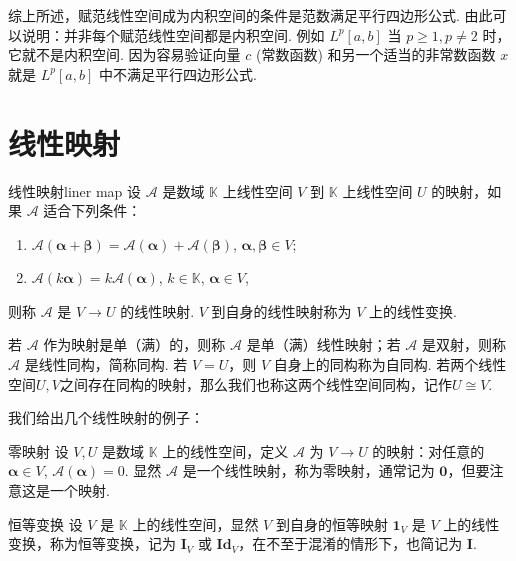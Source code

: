 \documentclass[12pt, a4paper,newtx]{ctexart}
\begin{document}
综上所述，赋范线性空间成为内积空间的条件是范数满足平行四边形公式. 由此可以说明：并非每个赋范线性空间都是内积空间. 例如 $L^p[a,b]$ 当 $p \geq 1, p \neq 2$ 时，它就不是内积空间. 因为容易验证向量 $c$ (常数函数) 和另一个适当的非常数函数 $x$ 就是 $L^p[a,b]$ 中不满足平行四边形公式.
\section{线性映射}
\begin{definition}{线性映射}{liner map}\kaishu 
	设 $\mathcal A$ 是数域 $\mathbb{K}$ 上线性空间 $V$ 到 $\mathbb{K}$ 上线性空间 $U$ 的映射，如果 $\mathcal A$ 适合下列条件：
	\begin{enumerate}
		\item $\mathcal A(\bm\alpha + \bm\beta) = \mathcal A(\bm\alpha) + \mathcal A(\bm\beta)$, $\bm\alpha, \bm\beta \in V$;
		\item $\mathcal A(k\bm\alpha) = k\mathcal A(\bm\alpha)$, $k \in \mathbb{K}$, $\bm\alpha \in V$,
	\end{enumerate}
	则称 $\mathcal A$ 是 $V \to U$ 的{\heiti 线性映射}. $V$ 到自身的线性映射称为 $V$ 上的{\heiti 线性变换}. 
	
	若 $\mathcal A$ 作为映射是单（满）的，则称 $\mathcal A$ 是单（满）线性映射；若 $\mathcal A$ 是双射，则称 $\mathcal A$ 是线性同构，简称{\heiti 同构}. 若 $V = U$，则 $V$ 自身上的同构称为{\heiti 自同构}. 若两个线性空间$U,V$之间存在同构的映射，那么我们也称这两个线性空间{\heiti 同构}，记作$U\cong V.$
\end{definition}
我们给出几个线性映射的例子：
\begin{example}{零映射}{}
	设 $V, U$ 是数域 $\mathbb{K}$ 上的线性空间，定义 $\mathcal A$ 为 $V \to U$ 的映射：对任意的 $\bm\alpha \in V$, $\mathcal A(\bm\alpha) = 0$. 显然 $\mathcal A$ 是一个线性映射，称为{\heiti 零映射}，通常记为 $\bm 0$，但要注意这是一个映射. 
\end{example}

\begin{example}{恒等变换}{}
	设 $V$ 是 $\mathbb{K}$ 上的线性空间，显然 $V$ 到自身的恒等映射 $\mathbf{1}_V$ 是 $V$ 上的线性变换，称为恒等变换，记为 $\mathbf{I}_V$ 或 $\mathbf{Id}_V$，在不至于混淆的情形下，也简记为 $\bm{I}$. 
\end{example}
\end{document}
